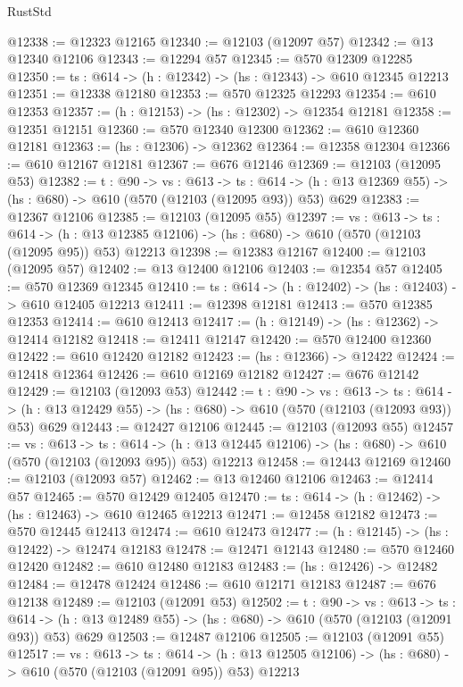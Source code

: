 \begin{lexlean}{RustStd}
\begin{coremodule}
@12338 := @12323 @12165
@12340 := @12103 (@12097 @57)
@12342 := @13 @12340 @12106
@12343 := @12294 @57
@12345 := @570 @12309 @12285
@12350 := {ts : @614} -> (h : @12342) -> (hs : @12343) -> @610 @12345 @12213
@12351 := @12338 @12180
@12353 := @570 @12325 @12293
@12354 := @610 @12353
@12357 := (h : @12153) -> (hs : @12302) -> @12354 @12181
@12358 := @12351 @12151
@12360 := @570 @12340 @12300
@12362 := @610 @12360 @12181
@12363 := (hs : @12306) -> @12362
@12364 := @12358 @12304
@12366 := @610 @12167 @12181
@12367 := @676 @12146
@12369 := @12103 (@12095 @53)
@12382 := {t : @90} ->
  {vs : @613} ->
  {ts : @614} -> (h : @13 @12369 @55) -> (hs : @680) -> @610 (@570 (@12103 (@12095 @93)) @53) @629
@12383 := @12367 @12106
@12385 := @12103 (@12095 @55)
@12397 := {vs : @613} ->
  {ts : @614} ->
  (h : @13 @12385 @12106) -> (hs : @680) -> @610 (@570 (@12103 (@12095 @95)) @53) @12213
@12398 := @12383 @12167
@12400 := @12103 (@12095 @57)
@12402 := @13 @12400 @12106
@12403 := @12354 @57
@12405 := @570 @12369 @12345
@12410 := {ts : @614} -> (h : @12402) -> (hs : @12403) -> @610 @12405 @12213
@12411 := @12398 @12181
@12413 := @570 @12385 @12353
@12414 := @610 @12413
@12417 := (h : @12149) -> (hs : @12362) -> @12414 @12182
@12418 := @12411 @12147
@12420 := @570 @12400 @12360
@12422 := @610 @12420 @12182
@12423 := (hs : @12366) -> @12422
@12424 := @12418 @12364
@12426 := @610 @12169 @12182
@12427 := @676 @12142
@12429 := @12103 (@12093 @53)
@12442 := {t : @90} ->
  {vs : @613} ->
  {ts : @614} -> (h : @13 @12429 @55) -> (hs : @680) -> @610 (@570 (@12103 (@12093 @93)) @53) @629
@12443 := @12427 @12106
@12445 := @12103 (@12093 @55)
@12457 := {vs : @613} ->
  {ts : @614} ->
  (h : @13 @12445 @12106) -> (hs : @680) -> @610 (@570 (@12103 (@12093 @95)) @53) @12213
@12458 := @12443 @12169
@12460 := @12103 (@12093 @57)
@12462 := @13 @12460 @12106
@12463 := @12414 @57
@12465 := @570 @12429 @12405
@12470 := {ts : @614} -> (h : @12462) -> (hs : @12463) -> @610 @12465 @12213
@12471 := @12458 @12182
@12473 := @570 @12445 @12413
@12474 := @610 @12473
@12477 := (h : @12145) -> (hs : @12422) -> @12474 @12183
@12478 := @12471 @12143
@12480 := @570 @12460 @12420
@12482 := @610 @12480 @12183
@12483 := (hs : @12426) -> @12482
@12484 := @12478 @12424
@12486 := @610 @12171 @12183
@12487 := @676 @12138
@12489 := @12103 (@12091 @53)
@12502 := {t : @90} ->
  {vs : @613} ->
  {ts : @614} -> (h : @13 @12489 @55) -> (hs : @680) -> @610 (@570 (@12103 (@12091 @93)) @53) @629
@12503 := @12487 @12106
@12505 := @12103 (@12091 @55)
@12517 := {vs : @613} ->
  {ts : @614} ->
  (h : @13 @12505 @12106) -> (hs : @680) -> @610 (@570 (@12103 (@12091 @95)) @53) @12213

\end{coremodule}
\end{lexlean}
